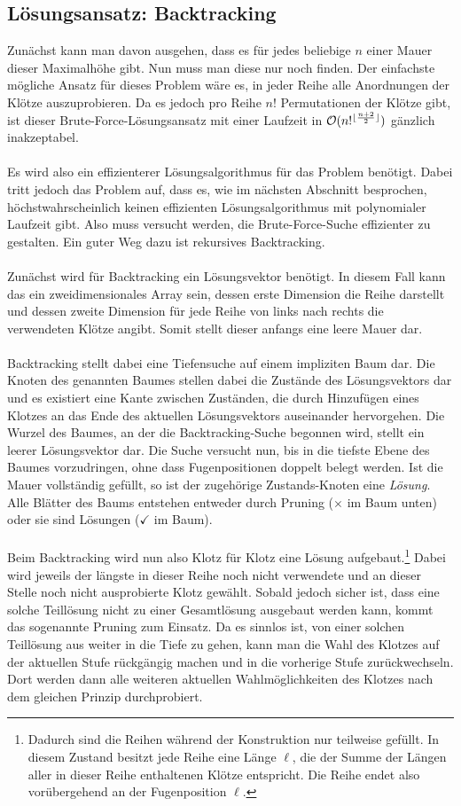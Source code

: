 \documentclass[a4paper, notitlepage, 12pt]{scrartcl}
\DeclarePairedDelimiter\floor{\lfloor}{\rfloor}
\begin{document}
\subsection{Lösungsansatz: Backtracking}
Zunächst kann man davon ausgehen, dass es für jedes beliebige $n$ einer Mauer dieser Maximalhöhe gibt. Nun muss man diese nur noch finden. Der einfachste mögliche Ansatz für dieses Problem wäre es, in jeder Reihe alle Anordnungen der Klötze auszuprobieren. Da es jedoch pro Reihe $n!$ Permutationen der Klötze gibt, ist dieser Brute-Force-Lösungsansatz mit einer Laufzeit in $\mathcal{O}(n!^{\floor{\frac{n + 2}{2}}})$ gänzlich inakzeptabel.
\\ \\
Es wird also ein effizienterer Lösungsalgorithmus für das Problem benötigt. Dabei tritt jedoch das Problem auf, dass es, wie im nächsten Abschnitt besprochen, höchstwahrscheinlich keinen effizienten Lösungsalgorithmus mit polynomialer Laufzeit gibt. Also muss versucht werden, die Brute-Force-Suche effizienter zu gestalten. Ein guter Weg dazu ist rekursives Backtracking.
\\ \\
Zunächst wird für Backtracking ein Lösungsvektor benötigt. In diesem Fall kann das ein zweidimensionales Array sein, dessen erste Dimension die Reihe darstellt und dessen zweite Dimension für jede Reihe von links nach rechts die verwendeten Klötze angibt. Somit stellt dieser anfangs eine leere Mauer dar. \\ \\ Backtracking stellt dabei eine Tiefensuche auf einem impliziten Baum dar. Die Knoten des genannten Baumes stellen dabei die Zustände des Lösungsvektors dar und es existiert eine Kante zwischen Zuständen, die durch Hinzufügen eines Klotzes an das Ende des aktuellen Lösungsvektors auseinander hervorgehen. Die Wurzel des Baumes, an der die Backtracking-Suche begonnen wird, stellt ein leerer Lösungsvektor dar. Die Suche versucht nun, bis in die tiefste Ebene des Baumes vorzudringen, ohne dass Fugenpositionen doppelt belegt werden. Ist die Mauer vollständig gefüllt, so ist der zugehörige Zustands-Knoten eine \emph{Lösung}. Alle Blätter des Baums entstehen entweder durch Pruning ($\times$ im Baum unten) oder sie sind Lösungen ($\checkmark$ im Baum).
\\ \\
Beim Backtracking wird nun also Klotz für Klotz eine Lösung aufgebaut.\footnote{Dadurch sind die Reihen während der Konstruktion nur teilweise gefüllt. In diesem Zustand besitzt jede Reihe eine Länge $\ell$, die der Summe der Längen aller in dieser Reihe enthaltenen Klötze entspricht. Die Reihe endet also vorübergehend an der Fugenposition $\ell$.}  Dabei wird jeweils der längste in dieser Reihe noch nicht verwendete und an dieser Stelle noch nicht ausprobierte Klotz gewählt. Sobald jedoch sicher ist, dass eine solche Teillösung nicht zu einer Gesamtlösung ausgebaut werden kann, kommt das sogenannte Pruning zum Einsatz. Da es sinnlos ist, von einer solchen Teillösung aus weiter in die Tiefe zu gehen, kann man die Wahl des Klotzes auf der aktuellen Stufe rückgängig machen und in die vorherige Stufe zurückwechseln. Dort werden dann alle weiteren aktuellen Wahlmöglichkeiten des Klotzes nach dem gleichen Prinzip durchprobiert.
\end{document}
